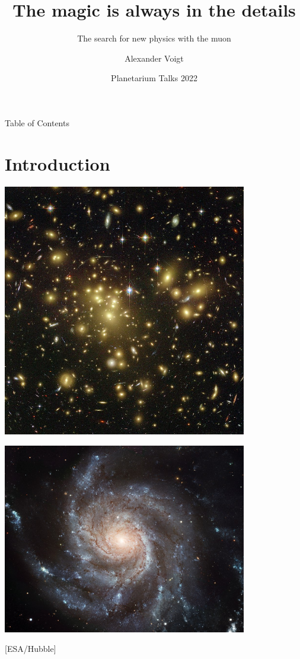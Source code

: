 \documentclass[12pt]{beamer}
\title{The magic is always in the details}
\subtitle{The search for new physics with the muon}
\author[Voigt]{Alexander Voigt}
\institute[HS Flensburg]{Hochschule Flensburg}
\date{Planetarium Talks 2022}
\begin{document}

\begin{frame}
  \titlepage
\end{frame}


\begin{frame}{Table of Contents}
  \tableofcontents
\end{frame}


\section{Introduction}

\begin{frame}{}
  \begin{center}
    \includegraphics[width=0.8\textwidth]{img/Gravitationell-lins-Hubble}
  \end{center}
\end{frame}

\begin{frame}{}
  \begin{center}
    \includegraphics[width=0.8\textwidth]{img/Galaxy-M101}

    \hfill\footnotesize [ESA/Hubble]
  \end{center}
\end{frame}
\end{document}
